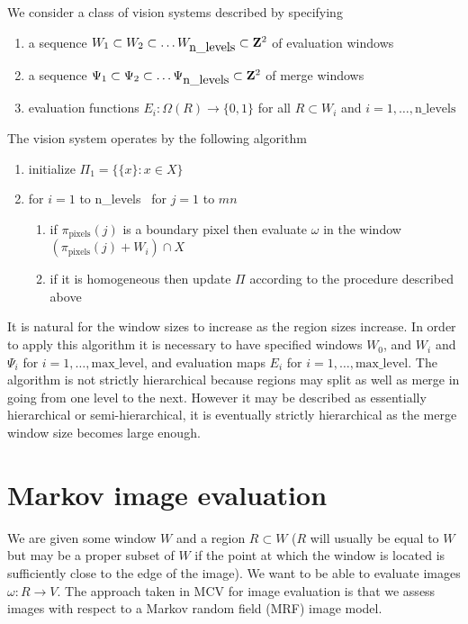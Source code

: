 \documentclass[12pt,twoside]{article}
\begin{document}
We consider a class of vision systems described by specifying
\begin{enumerate}
\item a sequence $W_1 \subset W_2 \subset \ldots W_{\mbox{n\_levels}} \subset {\bf Z}^2$ of evaluation windows
\item a sequence $\Psi_1 \subset \Psi_2 \subset \ldots \Psi_{\mbox{n\_levels}} \subset {\bf Z}^2$ of merge windows
\item evaluation functions $E_i : \Omega(R) \rightarrow \{0,1\}$ for all $R \subset W_i$ and $i = 1, \ldots, \mbox{n\_levels}$
\end{enumerate}
The vision system operates by the following algorithm
\begin{enumerate}
\item initialize $\Pi_1 = \{\{x\} : x \in X\}$
\item for $ i = 1$ to n\_levels \newline
\mbox{    }for $j=1$ to $mn$
\begin{enumerate}
\item if $\pi_{\mbox{pixels}}(j)$ is a boundary pixel then evaluate $\omega$ in the window $(\pi_{\mbox{pixels}}(j)+W_i)\cap X$
\item if it is homogeneous then update $\Pi$ according to the procedure described above
\end{enumerate}
\end{enumerate}

It is natural for the window sizes to increase as the region sizes increase. In order to apply
this algorithm it is necessary to have specified windows $W_0$, and $W_i$ and $\Psi_i$ for
$i = 1, \ldots, \mbox{max\_level}$, and evaluation maps $E_i$ for $i = 1, \ldots, \mbox{max\_level}$.
The algorithm is not strictly hierarchical
because regions may split as well as merge in going from one level to the next. However
it may be described as essentially hierarchical or semi-hierarchical, it is eventually strictly
hierarchical as the merge window size becomes large enough.

\section{Markov image evaluation}

We are given some window $W$ and a region $R \subset W$ ($R$ will usually be equal to $W$ but may be a
proper subset of $W$ if the point at which the window is located is sufficiently close to the edge
of the image). We want to be able to evaluate images $\omega : R \rightarrow V$. The approach taken in MCV
for image evaluation is that we assess images with respect to a Markov random field (MRF)
image model.
\end{document}
